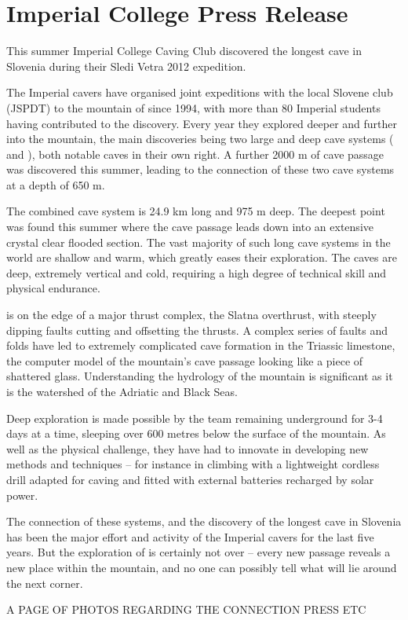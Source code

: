 \section{Imperial College Press Release}

This summer Imperial College Caving Club discovered the longest cave in Slovenia during their Sledi Vetra 2012 expedition.

The Imperial cavers have organised joint expeditions with the local Slovene club (JSPDT) to the mountain of  since 1994, with more than 80 Imperial students having contributed to the discovery. Every year they explored deeper and further into the mountain, the main discoveries being two large and deep cave systems ( and ), both notable caves in their own right. A further 2000 m of cave passage was discovered this summer, leading to the connection of these two cave systems at a depth of 650 m.

The combined cave system is 24.9 km long and 975 m deep. The deepest point was found this summer where the cave passage leads down into an extensive crystal clear flooded section. The vast majority of such long cave systems in the world are shallow and warm, which greatly eases their exploration. The  caves are deep, extremely vertical and cold, requiring a high degree of technical skill and physical endurance.

 is on the edge of a major thrust complex, the Slatna overthrust, with steeply dipping faults cutting and offsetting the thrusts. A complex series of faults and folds have led to extremely complicated cave formation in the Triassic limestone, the computer model of the mountain’s cave passage looking like a piece of shattered glass. Understanding the hydrology of the mountain is significant as it is the watershed of the Adriatic and Black Seas.

Deep exploration is made possible by the team remaining underground for 3-4 days at a time, sleeping over 600 metres below the surface of the mountain. As well as the physical challenge, they have had to innovate in developing new methods and techniques – for instance in climbing with a lightweight cordless drill adapted for caving and fitted with external batteries recharged by solar power.

The connection of these systems, and the discovery of the longest cave in Slovenia has been the major effort and activity of the Imperial cavers for the last five years. But the exploration of  is certainly not over – every new passage reveals a new place within the mountain, and no one can possibly tell what will lie around the next corner.

\newpage

A PAGE OF PHOTOS REGARDING THE CONNECTION PRESS ETC